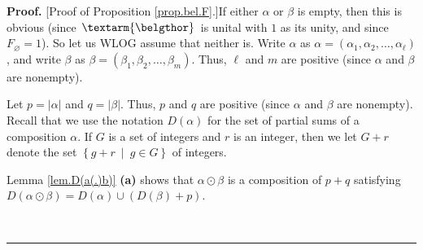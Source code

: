 \documentclass[numbers=enddot,12pt,final,onecolumn,notitlepage,abstracton]{scrartcl}%
\theoremstyle{definition}
\newenvironment{proof}[1][Proof]{\noindent\textbf{#1.} }{\ \rule{0.5em}{0.5em}}
\newenvironment{verlong}{}{}
\newcommand{\bel}{\left. \textarm{\belgthor} \right.}
\begin{document}
\begin{proof}
[Proof of Proposition \ref{prop.bel.F}.]If either $\alpha$ or $\beta$ is
empty, then this is obvious (since $\bel $ is unital with $1$ as its unity,
and since $F_{\varnothing}=1$). So let us WLOG assume that neither is. Write
$\alpha$ as $\alpha=\left(  \alpha_{1},\alpha_{2},\ldots,\alpha_{\ell}\right)
$, and write $\beta$ as $\beta=\left(  \beta_{1},\beta_{2},\ldots,\beta
_{m}\right)  $. Thus, $\ell$ and $m$ are positive (since $\alpha$ and $\beta$
are nonempty).

Let $p=\left\vert \alpha\right\vert $ and $q=\left\vert \beta\right\vert $.
Thus, $p$ and $q$ are positive (since $\alpha$ and $\beta$ are nonempty).
Recall that we use the notation $D\left(  \alpha\right)  $ for the set of
partial sums of a composition $\alpha$. If $G$ is a set of integers and $r$ is
an integer, then we let $G+r$ denote the set $\left\{  g+r\ \mid\ g\in
G\right\}  $ of integers.

\begin{verlong}
Lemma \ref{lem.D(a(.)b)} \textbf{(a)} shows that $\alpha\odot\beta$ is a
composition of $p+q$ satisfying $D\left(  \alpha\odot\beta\right)  =D\left(
\alpha\right)  \cup\left(  D\left(  \beta\right)  +p\right)  $.
\end{verlong}


\end{proof}
\end{document}
